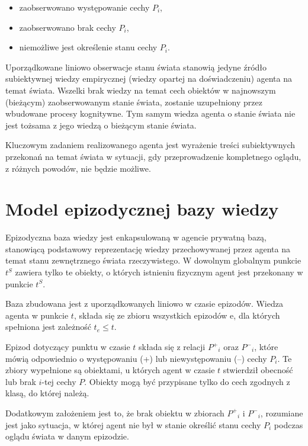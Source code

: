 	\begin{itemize}
	 	\setlength{\itemindent}{.5in}
		\item zaobserwowano występowanie cechy $ P_i $,
		\item zaobserwowano brak cechy $ P_i $,
		\item niemożliwe jest określenie stanu cechy $ P_i $.
	\end{itemize}
	
	Uporządkowane liniowo obserwacje stanu świata stanowią jedyne źródło subiektywnej wiedzy empirycznej (wiedzy opartej na doświadczeniu) agenta na temat świata. Wszelki brak wiedzy na temat cech obiektów w najnowszym (bieżącym) zaobserwowanym stanie świata, zostanie uzupełniony przez wbudowane procesy kognitywne. Tym samym wiedza agenta o stanie świata nie jest tożsama z jego wiedzą o bieżącym stanie świata.
	
	Kluczowym zadaniem realizowanego agenta jest wyrażenie treści subiektywnych przekonań na temat świata w sytuacji, gdy przeprowadzenie kompletnego oglądu, z różnych powodów, nie będzie możliwe.
	

\section{Model epizodycznej bazy wiedzy}

Epizodyczna baza wiedzy jest enkapsulowaną w agencie prywatną bazą, stanowiącą podstawowy reprezentację wiedzy przechowywanej przez agenta na temat stanu zewnętrznego świata rzeczywistego. W dowolnym globalnym punkcie $ t^S $ zawiera tylko te obiekty, o których istnieniu fizycznym agent jest przekonany w punkcie $ t^S $.

Baza zbudowana jest z uporządkowanych liniowo w czasie epizodów. Wiedza agenta w punkcie $ t $, składa się ze zbioru wszystkich epizodów e, dla których spełniona jest zależność $ t_e \le t $. 

Epizod dotyczący punktu w czasie $ t $ składa się z relacji 
$ P^+{}_i $ oraz $ P^-{}_i $, 
które mówią odpowiednio o występowaniu (+) lub niewystępowaniu (--) cechy $ P_i $. Te zbiory wypełnione są obiektami, u których agent w czasie $ t $ stwierdził obecność lub brak $ i $-tej cechy $ P $. Obiekty mogą być przypisane tylko do cech zgodnych z klasą, do której należą. 

Dodatkowym założeniem jest to, że brak obiektu w zbiorach 
$ P^+{}_i $ i $ P^-{}_i $, 
rozumiane jest jako sytuacja, w której agent nie był w stanie określić stanu cechy $ P_i $ podczas oglądu świata w danym epizodzie.

